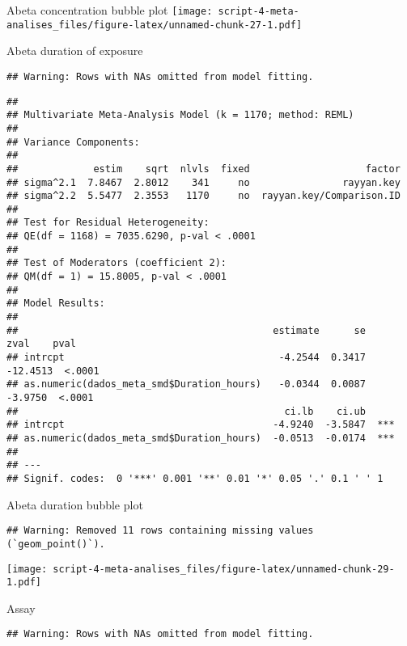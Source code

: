 \documentclass[
]{article}
\begin{document}
Abeta concentration bubble plot
\texttt{[image: script-4-meta-analises\_files/figure-latex/unnamed-chunk-27-1.pdf]}

Abeta duration of exposure

\begin{verbatim}
## Warning: Rows with NAs omitted from model fitting.
\end{verbatim}

\begin{verbatim}
## 
## Multivariate Meta-Analysis Model (k = 1170; method: REML)
## 
## Variance Components:
## 
##             estim    sqrt  nlvls  fixed                    factor 
## sigma^2.1  7.8467  2.8012    341     no                rayyan.key 
## sigma^2.2  5.5477  2.3553   1170     no  rayyan.key/Comparison.ID 
## 
## Test for Residual Heterogeneity:
## QE(df = 1168) = 7035.6290, p-val < .0001
## 
## Test of Moderators (coefficient 2):
## QM(df = 1) = 15.8005, p-val < .0001
## 
## Model Results:
## 
##                                            estimate      se      zval    pval 
## intrcpt                                     -4.2544  0.3417  -12.4513  <.0001 
## as.numeric(dados_meta_smd$Duration_hours)   -0.0344  0.0087   -3.9750  <.0001 
##                                              ci.lb    ci.ub      
## intrcpt                                    -4.9240  -3.5847  *** 
## as.numeric(dados_meta_smd$Duration_hours)  -0.0513  -0.0174  *** 
## 
## ---
## Signif. codes:  0 '***' 0.001 '**' 0.01 '*' 0.05 '.' 0.1 ' ' 1
\end{verbatim}

Abeta duration bubble plot

\begin{verbatim}
## Warning: Removed 11 rows containing missing values (`geom_point()`).
\end{verbatim}

\texttt{[image: script-4-meta-analises\_files/figure-latex/unnamed-chunk-29-1.pdf]}

Assay

\begin{verbatim}
## Warning: Rows with NAs omitted from model fitting.
\end{verbatim}
\end{document}
